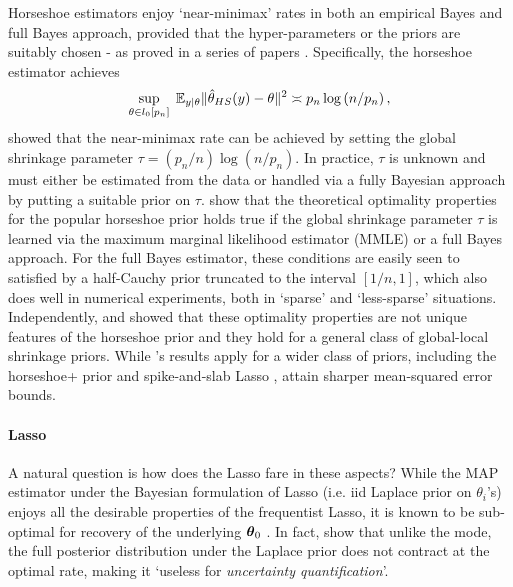\documentclass[11pt]{article}
\begin{document}
Horseshoe estimators enjoy `near-minimax' rates in both an empirical Bayes and full Bayes approach, provided that the hyper-parameters or the priors are suitably chosen - as proved in a series of papers \citep{van2014horseshoe,van2015conditions,van2016many,van2017adaptive}. Specifically, the horseshoe estimator achieves
\begin{equation}
\sup_{ \theta \in l_0[p_n] } \; \mathbb{E}_{ y | \theta } \lVert {\hat{\theta}}_{HS}{} (y) - \theta \rVert^2 \asymp p_n \log \left ( n / p_n \right ), \label{eq:minimax}
\end{equation}
\citet{van2014horseshoe} showed that the near-minimax rate can be achieved by setting the global shrinkage parameter $\tau = (p_n/n) \log(n/p_n)$. In practice, $\tau$ is unknown and must either be estimated from the data or handled via a fully Bayesian approach by putting a suitable prior on $\tau$.  \cite{van2017adaptive} show that the theoretical optimality properties for the popular horseshoe prior holds true if the global shrinkage parameter $\tau$ is learned via the maximum marginal likelihood estimator (MMLE) or a full Bayes approach. For the full Bayes estimator, these conditions are easily seen to satisfied by a half-Cauchy prior truncated to the interval $[1/n,1]$, which also does well in numerical experiments, both in `sparse' and `less-sparse' situations. Independently, \citet{van2015conditions} and \citet{ghosh2016asymptotic} showed that these optimality properties are not unique features of the horseshoe prior and they hold for a general class of global-local shrinkage priors. While \cite{van2015conditions}'s results apply for a wider class of priors, including the horseshoe+ prior \citep{bhadra2015horseshoe+} and spike-and-slab Lasso \citep{rovckova2016spike}, \citet{ghosh2016asymptotic} attain sharper mean-squared error bounds. 

\paragraph{Lasso}

A natural question is how does the Lasso fare in these aspects? While the MAP estimator under the Bayesian formulation of Lasso (i.e. iid Laplace prior on $\theta_i$'s) enjoys all the desirable properties of the frequentist Lasso, it is known to be sub-optimal for recovery of the underlying $\boldsymbol{\theta}_0$ \citep{castillo2012needles}. In fact, \cite{castillo2012needles} show that unlike the mode, the full posterior distribution under the Laplace prior does not contract at the optimal rate, making it `useless for \textit{uncertainty quantification}'. 
\end{document}
